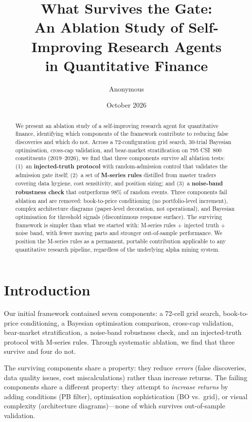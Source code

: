 \documentclass[11pt]{article}
\title{What Survives the Gate:\\
An Ablation Study of Self-Improving Research Agents\\
in Quantitative Finance}
\author{Anonymous}
\date{October 2026}
\begin{document}
\maketitle

\begin{abstract}
\noindent
We present an ablation study of a self-improving research agent for
quantitative finance, identifying which components of the framework
contribute to reducing false discoveries and which do not. Across a
72-configuration grid search, 30-trial Bayesian optimisation, cross-cap
validation, and bear-market stratification on 795 CSI~800 constituents
(2019--2026), we find that three components survive all ablation tests:
(1)~an \textbf{injected-truth protocol} with random-admission control that
validates the admission gate itself; (2)~a set of \textbf{M-series rules}
distilled from master traders covering data hygiene, cost sensitivity, and
position sizing; and (3)~a \textbf{noise-band robustness check} that
outperforms 98\% of random events. Three components fail ablation and are
removed: book-to-price conditioning (no portfolio-level increment), complex
architecture diagrams (paper-level decoration, not operational), and
Bayesian optimisation for threshold signals (discontinuous response surface).
The surviving framework is simpler than what we started with: M-series rules
+ injected truth + noise band, with fewer moving parts and stronger
out-of-sample performance. We position the M-series rules as a permanent,
portable contribution applicable to any quantitative research pipeline,
regardless of the underlying alpha mining system.
\end{abstract}

\section{Introduction}

Our initial framework contained seven components: a 72-cell grid search, book-to-price
conditioning, a Bayesian optimisation comparison, cross-cap validation, bear-market
stratification, a noise-band robustness check, and an injected-truth protocol with
M-series rules. Through systematic ablation, we find that three survive and four do not.

The surviving components share a property: they reduce \emph{errors} (false
discoveries, data quality issues, cost miscalculations) rather than increase returns.
The failing components share a different property: they attempt to \emph{increase
returns} by adding conditions (PB filter), optimisation sophistication (BO vs.\
grid), or visual complexity (architecture diagrams)---none of which survives
out-of-sample validation.
\end{document}
